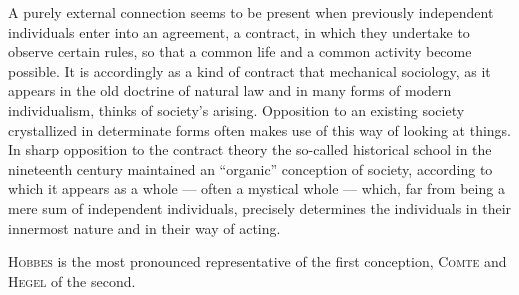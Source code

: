 \documentclass[12pt]{book}
\newcommand{\opage}[1]{\marginnote{\footnotesize\textit{[#1]}}}
\begin{document}
A purely external connection seems to be present when previously independent
individuals enter into an agreement, a contract, in which they undertake to observe
certain rules, so that a common life and a common activity become possible. It is
accordingly as a kind of contract that mechanical sociology, as it appears in the old
doctrine of natural law and in many forms of modern individualism, thinks of society's
arising. Opposition to an existing society crystallized in determinate forms often
makes use of this way of looking at things. In sharp opposition to the contract theory
the so-called historical school in the nineteenth century maintained an ``organic''
conception of society, according to which it appears as a whole --- often a \opage{60}mystical
whole --- which, far from being a mere sum of independent individuals, precisely
determines the individuals in their innermost nature and in their way of acting.

\textsc{Hobbes} is the most pronounced representative of the first conception,
\textsc{Comte} and \textsc{Hegel} of the second.
\end{document}
